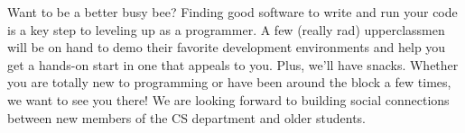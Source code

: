 Want to be a better busy bee? Finding good software to write and run your code is a key step to leveling up as a programmer. A few (really rad) upperclassmen will be on hand to demo their favorite development environments and help you get a hands-on start in one that appeals to you. Plus, we'll have snacks. Whether you are totally new to programming or have been around the block a few times, we want to see you there! We are looking forward to building social connections between new members of the CS department and older students.
